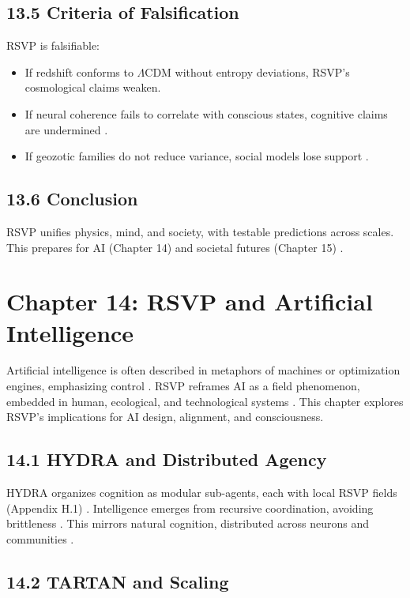 \documentclass[12pt]{article}
\begin{document}
{{\subsection*{13.5 Criteria of Falsification}

RSVP is falsifiable:
\begin{itemize}
    \item If redshift conforms to \(\Lambda\)CDM without entropy deviations, RSVP’s cosmological claims weaken.
    \item If neural coherence fails to correlate with conscious states, cognitive claims are undermined \citep{tononi2004}.
    \item If geozotic families do not reduce variance, social models lose support \citep{hanson2003}.
\end{itemize}

\subsection*{13.6 Conclusion}

RSVP unifies physics, mind, and society, with testable predictions across scales. This prepares for AI (Chapter 14) and societal futures (Chapter 15) \citep{whitehead1978}.

\section*{Chapter 14: RSVP and Artificial Intelligence}

Artificial intelligence is often described in metaphors of machines or optimization engines, emphasizing control \citep{friston2010}. RSVP reframes AI as a field phenomenon, embedded in human, ecological, and technological systems \citep{whitehead1978}. This chapter explores RSVP’s implications for AI design, alignment, and consciousness.

\subsection*{14.1 HYDRA and Distributed Agency}

HYDRA organizes cognition as modular sub-agents, each with local RSVP fields (Appendix H.1) \citep{bird1988}. Intelligence emerges from recursive coordination, avoiding brittleness \citep{pearl2009}. This mirrors natural cognition, distributed across neurons and communities \citep{hohwy2013}.

\subsection*{14.2 TARTAN and Scaling}

}}
\end{document}
